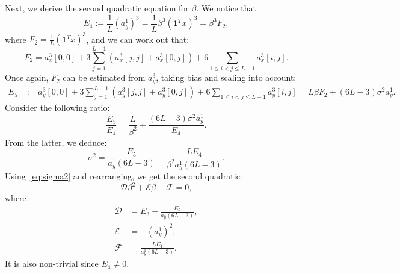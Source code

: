 \documentclass[12pt]{article}
\newcommand{\1}{\mathbf{1}}
\newcommand{\one}{\mathbf{1}}
\theoremstyle{plain}
\theoremstyle{definition}
\theoremstyle{remark}
\theoremstyle{plain}
\theoremstyle{remark}
\theoremstyle{plain}
\theoremstyle{plain}
\theoremstyle{plain}
\numberwithin{equation}{section}
\begin{document}
Next, we derive the second quadratic equation for $\beta$. We notice that 
\begin{equation} \label{eq:E3}
E_4 := \frac{1}{L}(a_y^1)^3 = \frac{1}{L}\beta^3 (\one ^Tx)^3   = \beta^3 F_2,
\end{equation}
where $F_2 = \frac{1}{L}(\one ^Tx)^3$, and we can work out that:
\begin{equation*}
F_2 = a_x^3[0,0] + 3\sum_{j=1}^{L-1} \left(a_x^3[j,j] + a_x^3[0,j]\right) + 6\sum_{1\leq i < j\leq L-1}a_x^3[i,j].
\end{equation*}
Once again, $F_2$ can be estimated from $a_y^3$, taking bias and scaling into account:
\begin{align}
E_5 & := a_y^3[0,0] + 3\sum_{j=1}^{L-1} \left(a_y^3[j,j] + a_y^3[0,j]\right) + 6\sum_{1\leq i < j\leq L-1}a_y^3[i,j]  = L \beta F_2 + (6L-3)\sigma^2a_y^1.
\end{align}
Consider the following ratio:
\begin{equation*} 
\frac{E_5}{E_4} = \frac{L}{\beta^2} + \frac{(6L-3)\sigma^2a_y^1}{E_4}.
\end{equation*}
From the latter, we deduce:
\begin{equation*}
\sigma^2 = \frac{E_5}{a_y^1(6L-3)}  - \frac{LE_4}{\beta^2a_y^1(6L-3)}.
\end{equation*}
Using~\eqref{eq:sigma2} and rearranging, we get the second quadratic:
\begin{equation} \label{eq:quad2}
\mathcal{D}\beta^2 + \mathcal{E}\beta + \mathcal{F} = 0,
\end{equation}
where
\begin{align*}
\mathcal{D} &= E_3 - \frac{E_5}{a_y^1(6L-3)}, \\ 
\mathcal{E} &= -(a_y^1)^2, \\
\mathcal{F} &= \frac{LE_4}{a_y^1(6L-3)}.
\end{align*}
It is also non-trivial since $E_4 \neq 0$.
\end{document}
